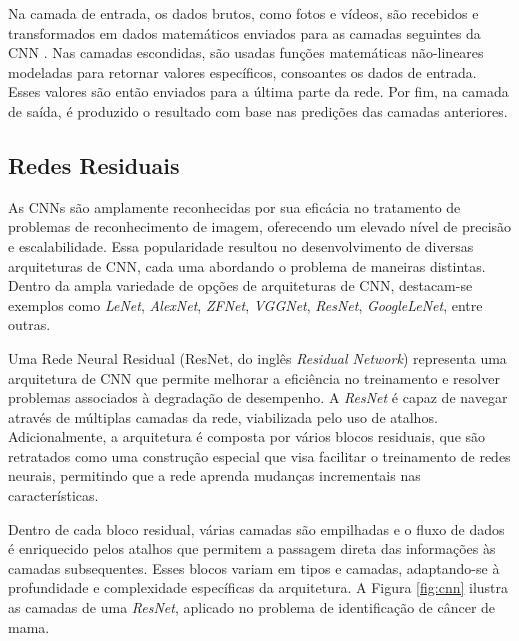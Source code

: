 Na camada de entrada, os dados brutos, como fotos e vídeos, são recebidos e transformados em dados matemáticos enviados para as camadas seguintes da CNN \cite{cnn}. Nas camadas escondidas, são usadas funções matemáticas não-lineares modeladas para retornar valores específicos, consoantes os dados de entrada. Esses valores são então enviados para a última parte da rede. Por fim, na camada de saída, é produzido o resultado com base nas predições das camadas anteriores.


\subsection{\esp Redes Residuais} \label{redesresiduais}

As CNNs são amplamente reconhecidas por sua eficácia no tratamento de problemas de reconhecimento de imagem, oferecendo um elevado nível de precisão e escalabilidade. Essa popularidade resultou no desenvolvimento de diversas arquiteturas de CNN, cada uma abordando o problema de maneiras distintas. Dentro da ampla variedade de opções de arquiteturas de CNN, destacam-se exemplos como \textit{LeNet}, \textit{AlexNet}, \textit{ZFNet}, \textit{VGGNet}, \textit{ResNet}, \textit{GoogleLeNet}, entre outras. 

Uma Rede Neural Residual (ResNet, do inglês \textit{Residual Network}) representa uma arquitetura de CNN que permite melhorar a eficiência no treinamento e resolver problemas associados à degradação de desempenho. A \textit{ResNet} é capaz de navegar através de múltiplas camadas da rede, viabilizada pelo uso de atalhos. Adicionalmente, a arquitetura é composta por vários blocos residuais, que são retratados como uma construção especial que visa facilitar o treinamento de redes neurais, permitindo que a rede aprenda mudanças incrementais nas características. 

Dentro de cada bloco residual, várias camadas são empilhadas e o fluxo de dados é enriquecido pelos atalhos que permitem a passagem direta das informações às camadas subsequentes. Esses blocos variam em tipos e camadas, adaptando-se à profundidade e complexidade específicas da arquitetura. A Figura \ref{fig:cnn} ilustra as camadas de uma \textit{ResNet}, aplicado no problema de identificação de câncer de mama.

